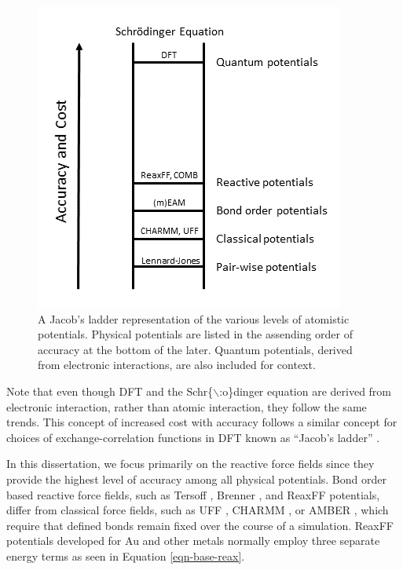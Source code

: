 \documentclass[12pt]{cmuthesis}
\begin{document}
\begin{figure}[h]
\centering
\includegraphics[width=4in]{./images/fig-jacobs-ladder.png}
\caption{A Jacob's ladder representation of the various levels of atomistic potentials. Physical potentials are listed in the assending order of accuracy at the bottom of the later. Quantum potentials, derived from electronic interactions, are also included for context. \label{fig-jacobs-ladder}}
\end{figure}

Note that even though DFT and the Schr\{$\backslash$:o\}dinger equation are derived from electronic interaction, rather than atomic interaction, they follow the same trends. This concept of increased cost with accuracy follows a similar concept for choices of exchange-correlation functions in DFT known as ``Jacob's ladder'' \cite{perdew-2005-presc-desig}.

In this dissertation, we focus primarily on the reactive force fields since they provide the highest level of accuracy among all physical potentials. Bond order based reactive force fields, such as Tersoff \cite{tersoff-1988-new}, Brenner \cite{brenner-1990-empir}, and ReaxFF \cite{nielson-2005-devel-reaxf,duin-2001-reaxf} potentials, differ from classical force fields, such as UFF \cite{casewit-1992-applic,rappe-1992-uff}, CHARMM \cite{brooks-1983-charm}, or AMBER \cite{cornell-1995-secon-gener,cornell-1996-secon-gener}, which require that defined bonds remain fixed over the course of a simulation. ReaxFF potentials developed for Au and other metals normally employ three separate energy terms as seen in Equation \ref{eqn-base-reax}. \cite{jarvi-2008-devel-reaxf,keith-2010-react-forcef,cabrera-trujillo-2015-theor}
\end{document}
